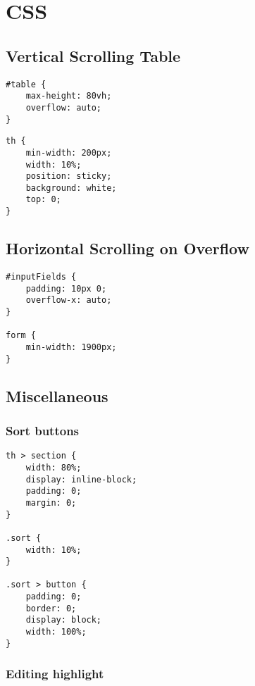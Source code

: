 \documentclass[letterpaper]{article}
\begin{document}
\newpage

\section{CSS}\label{CSS}

\subsection{Vertical Scrolling Table}

\begin{lstlisting}[firstnumber=29]
#table {
    max-height: 80vh;
    overflow: auto;
}
\end{lstlisting}

\begin{lstlisting}[firstnumber=39]
th {
    min-width: 200px;
    width: 10%;
    position: sticky;
    background: white;
    top: 0;
}
\end{lstlisting}

\subsection{Horizontal Scrolling on Overflow}\label{overflow-x}

\begin{lstlisting}[firstnumber=5]
#inputFields {
    padding: 10px 0;
    overflow-x: auto;
}

form {
    min-width: 1900px;
}
\end{lstlisting}

\subsection{Miscellaneous}

\subsubsection{Sort buttons}

\begin{lstlisting}[firstnumber=47]
th > section {
    width: 80%;
    display: inline-block;
    padding: 0;
    margin: 0;
}

.sort {
    width: 10%;
}

.sort > button {
    padding: 0;
    border: 0;
    display: block;
    width: 100%;
}
\end{lstlisting}

\subsubsection{Editing highlight}
\end{document}
